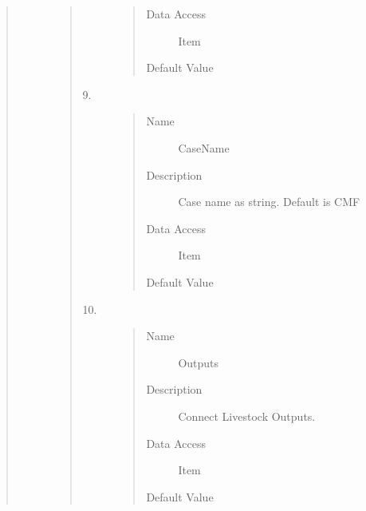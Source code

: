 \documentclass[letterpaper,10pt,english]{sphinxmanual}
\begin{document}
\begin{quote}
\begin{description}
\begin{quote}
\begin{description}
\begin{quote}
\begin{description}
\item[{Data Access}] \leavevmode
Item

\item[{Default Value}] \leavevmode
{}

\end{description}\end{quote}

\item[{9.}] \leavevmode\begin{quote}\begin{description}
\item[{Name}] \leavevmode
CaseName

\item[{Description}] \leavevmode
Case name as string. Default is CMF

\item[{Data Access}] \leavevmode
Item

\item[{Default Value}] \leavevmode
{}

\end{description}\end{quote}

\item[{10.}] \leavevmode\begin{quote}\begin{description}
\item[{Name}] \leavevmode
Outputs

\item[{Description}] \leavevmode
Connect Livestock Outputs.

\item[{Data Access}] \leavevmode
Item

\item[{Default Value}] \leavevmode
{}

\end{description}\end{quote}


\end{description}
\end{quote}
\end{description}
\end{quote}
\end{document}
